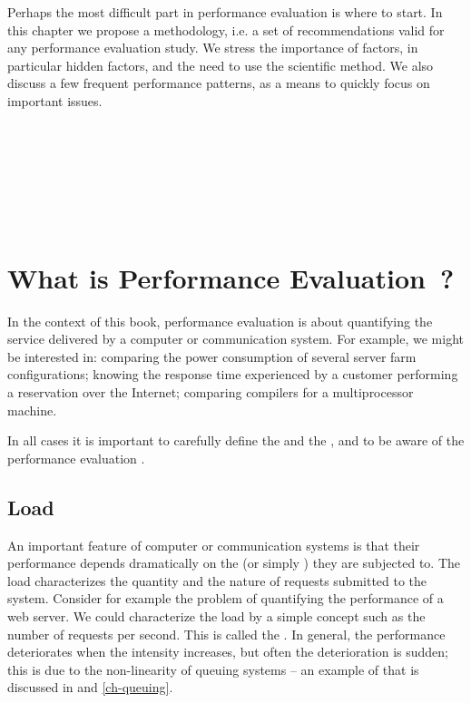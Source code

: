 \begin{minipage}[b]{0.5\textwidth}
Perhaps the most difficult part in performance
evaluation is where to start. In this chapter we
propose a methodology, i.e. a set of
recommendations valid for any performance
evaluation study. We stress the importance of
factors, in particular hidden factors, and the
need to use the scientific method. We also
discuss a few frequent performance patterns, as a
means to quickly focus on important issues.
~\\~\\~\\~\\
\end{minipage}
 ~
\begin{minipage}[b]{0.5\textwidth}
\hspace{1cm} ~~~~
 ~\\
\end{minipage}

\minitoc
\section{What is Performance
Evaluation~?}\label{sec-cose} In the context of this book,
performance evaluation is about quantifying the service
delivered by a computer or communication system. For example,
we might be interested in: comparing the power consumption of
several server farm configurations; knowing the response time
experienced by a customer performing a reservation over the
Internet; comparing compilers for a multiprocessor machine.

In all cases it is important to carefully define the  and
the , and to be aware of the performance evaluation
.

\subsection{Load}

An important feature of computer or communication systems is that
their performance depends dramatically on the  (or
simply ) they are subjected to. The load characterizes the
quantity and the nature of requests submitted to the system.
Consider for example the problem of quantifying the performance of a
web server. We could characterize the load by a simple concept such
as the number of requests per second. This is called the
. In general, the performance
deteriorates when the intensity increases, but often the
deterioration is sudden; this is due to the non-linearity of queuing
systems -- an example of  that is discussed
in  and \cref{ch-queuing}.


